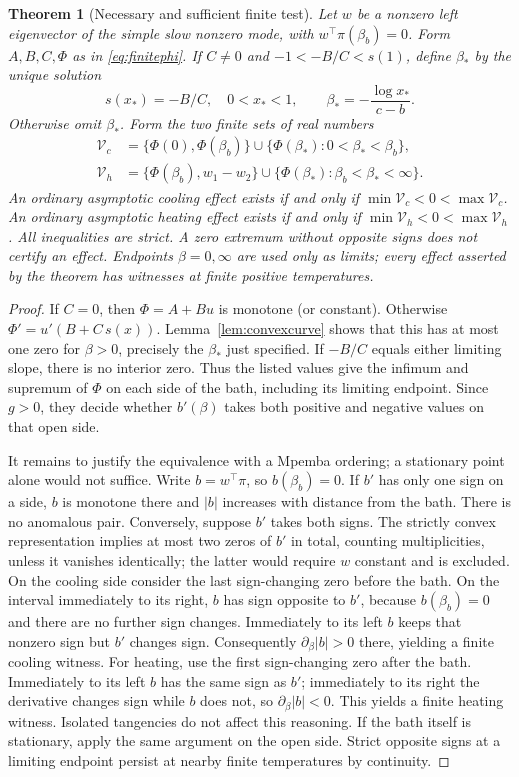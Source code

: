 \documentclass[11pt]{article}
\newtheorem{theorem}{Theorem}
\begin{document}
\begin{theorem}[Necessary and sufficient finite test]\label{thm:finiteclassification}
Let $w$ be a nonzero left eigenvector of the simple slow nonzero mode, with
$w^\top\pi(\beta_b)=0$. Form $A,B,C,\Phi$ as in \eqref{eq:finitephi}.
If $C\ne0$ and $-1<-B/C<s(1)$, define $\beta_*$ by the unique solution
\[
s(x_*)=-B/C,\quad 0<x_*<1,\qquad
\beta_*=-\frac{\log x_*}{c-b}.
\]
Otherwise omit $\beta_*$. Form the two finite sets of real numbers
\begin{align*}
\mathcal V_c&=\{\Phi(0),\Phi(\beta_b)\}
\cup\{\Phi(\beta_*):0<\beta_*<\beta_b\},\\
\mathcal V_h&=\{\Phi(\beta_b),w_1-w_2\}
\cup\{\Phi(\beta_*):\beta_b<\beta_*<\infty\}.
\end{align*}
An ordinary asymptotic cooling effect exists if and only if
$\min\mathcal V_c<0<\max\mathcal V_c$. An ordinary asymptotic heating effect
exists if and only if $\min\mathcal V_h<0<\max\mathcal V_h$.
All inequalities are strict. A zero extremum without opposite signs does not
certify an effect. Endpoints $\beta=0,\infty$ are used only as limits; every
effect asserted by the theorem has witnesses at finite positive temperatures.
\end{theorem}
\begin{proof}
If $C=0$, then $\Phi=A+Bu$ is monotone (or constant). Otherwise
$\Phi'=u'(B+C\,s(x))$. Lemma~\ref{lem:convexcurve} shows that this has at
most one zero for $\beta>0$, precisely the $\beta_*$ just specified. If
$-B/C$ equals either limiting slope, there is no interior zero. Thus the
listed values give the infimum and supremum of $\Phi$ on each side of the
bath, including its limiting endpoint. Since $g>0$, they decide whether
$b'(\beta)$ takes both positive and negative values on that open side.

It remains to justify the equivalence with a Mpemba ordering; a stationary
point alone would not suffice. Write $b=w^\top\pi$, so $b(\beta_b)=0$.
If $b'$ has only one sign on a side, $b$ is monotone there and $|b|$ increases
with distance from the bath. There is no anomalous pair. Conversely, suppose
$b'$ takes both signs. The strictly convex representation implies at most
two zeros of $b'$ in total, counting multiplicities, unless it vanishes
identically; the latter would require $w$ constant and is excluded. On the
cooling side consider the last sign-changing zero before the bath. On the
interval immediately to its right, $b$ has sign opposite to $b'$, because
$b(\beta_b)=0$ and there are no further sign changes. Immediately to its
left $b$ keeps that nonzero sign but $b'$ changes sign. Consequently
$\partial_\beta|b|>0$ there, yielding a finite cooling witness. For heating,
use the first sign-changing zero after the bath. Immediately to its left
$b$ has the same sign as $b'$; immediately to its right the derivative changes
sign while $b$ does not, so $\partial_\beta|b|<0$. This yields a finite
heating witness. Isolated tangencies do not affect this reasoning. If the
bath itself is stationary, apply the same argument on the open side.
Strict opposite signs at a limiting endpoint persist at nearby finite
temperatures by continuity.
\end{proof}
\end{document}
